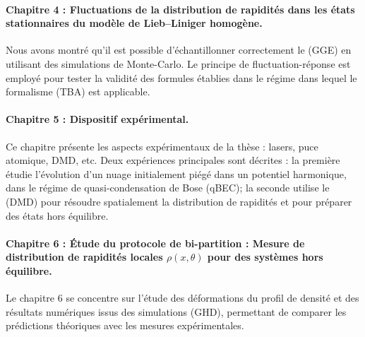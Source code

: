 
\paragraph{Chapitre 4 : Fluctuations de la distribution de rapidités dans les états stationnaires du modèle de Lieb–Liniger homogène.}  
Nous avons montré qu'il est possible d'échantillonner correctement le (\acrshort{GGE}) en utilisant des simulations de Monte-Carlo. Le principe de fluctuation-réponse est employé pour tester la validité des formules établies dans le régime dans lequel le formalisme (\acrshort{TBA}) est applicable.



\paragraph{Chapitre 5 : Dispositif expérimental.}  
Ce chapitre présente les aspects expérimentaux de la thèse : lasers, puce atomique, \gls{DMD}, etc. Deux expériences principales sont décrites : la première étudie l’évolution d’un nuage initialement piégé dans un potentiel harmonique, dans le régime de quasi-condensation de Bose (\acrshort{qBEC}); la seconde utilise le (\acrshort{DMD}) pour résoudre spatialement la distribution de rapidités et pour préparer des états hors équilibre.

\paragraph{Chapitre 6 : Étude du protocole de bi-partition : Mesure de distribution de rapidités locales $\rho(x , \theta ) $  pour des systèmes hors équilibre.}
Le chapitre 6 se concentre sur l’étude des déformations du profil de densité et des résultats numériques issus des simulations (\acrshort{GHD}), permettant de comparer les prédictions théoriques avec les mesures expérimentales.

